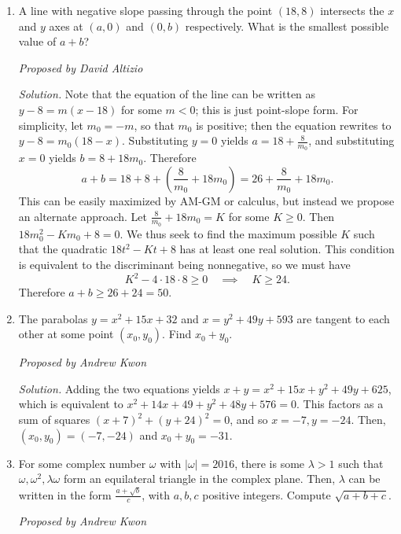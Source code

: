 \documentclass[10pt]{article}
\newcommand{\proposed}[1]
{
\vspace{5pt}
\noindent\textit{Proposed by #1}
}
\newcommand{\solution}
{
\vspace{5pt}
\noindent\textit{Solution.}\qquad
}
\begin{document}
\begin{enumerate}
\item A line with negative slope passing through the point $(18,8)$ intersects the $x$ and $y$ axes at $(a,0)$ and $(0,b)$ respectively.  What is the smallest possible value of $a+b$? 

\proposed{David Altizio}

\solution Note that the equation of the line can be written as $y-8=m(x-18)$ for some $m<0$; this is just point-slope form.  For simplicity, let $m_0=-m$, so that $m_0$ is positive; then the equation rewrites to $y-8=m_0(18-x)$.  Substituting $y=0$ yields $a=18+\tfrac{8}{m_0}$, and substituting $x=0$ yields $b=8+18m_0$.  Therefore \[a+b=18+8+\left(\frac{8}{m_0}+18m_0\right)=26+\frac{8}{m_0}+18m_0.\] This can be easily maximized by AM-GM or calculus, but instead we propose an alternate approach.  Let $\tfrac{8}{m_0}+18m_0=K$ for some $K\geq 0$.  Then $18m_0^2-Km_0+8=0$.  We thus seek to find the maximum possible $K$ such that the quadratic $18t^2-Kt+8$ has at least one real solution.  This condition is equivalent to the discriminant being nonnegative, so we must have \[K^2-4\cdot 18\cdot 8 \geq 0\quad\implies\quad K\geq 24.\] Therefore $a+b\geq 26+24=\boxed{50}$.

\item The parabolas $y=x^2+15x+32$ and $x = y^2+49y+593$ are tangent to each other at some point $(x_0,y_0)$.  Find $x_0+y_0$.

\proposed{Andrew Kwon}

\solution Adding the two equations yields $x+y = x^{2} + 15x + y^{2} + 49y +
625$, which is equivalent to $x^{2} + 14x + 49 + y^{2} + 48y + 576 = 0$. This
factors as a sum of squares $(x+7)^{2} + (y+24)^{2} = 0$, and so $x= -7, y =
-24$. Then, $(x_{0},y_{0}) = (-7,-24)$ and $x_{0} + y_{0} = \boxed{-31}$.

\item For some complex number $\omega$ with $|\omega| = 2016$, there is some $\lambda> 1$
	such that $\omega, \omega^{2}, \lambda \omega$ form an equilateral triangle in the
	complex plane. Then, $\lambda$ can be written in the form
	$\frac{a+\sqrt{b}}{c}$, with $a,b,c$ positive integers. Compute
	$\sqrt{a+b+c}$.

\proposed{Andrew Kwon}


\end{enumerate}
\end{document}
